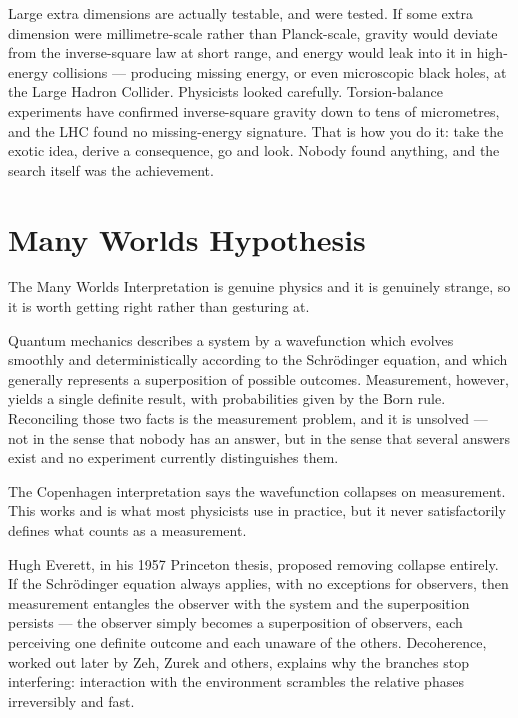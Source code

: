 \begin{funfact}
Large extra dimensions are actually testable, and were tested. If some extra dimension were
millimetre-scale rather than Planck-scale, gravity would deviate from the inverse-square law at
short range, and energy would leak into it in high-energy collisions --- producing missing
energy, or even microscopic black holes, at the Large Hadron Collider. Physicists looked
carefully. Torsion-balance experiments have confirmed inverse-square gravity down to tens of
micrometres, and the LHC found no missing-energy signature. That is how you do it: take the
exotic idea, derive a consequence, go and look. Nobody found anything, and the search itself was
the achievement.
\end{funfact}

\section{Many Worlds Hypothesis}\label{sec:manyworldshypothesis}

The Many Worlds Interpretation is genuine physics and it is genuinely strange, so it is worth
getting right rather than gesturing at.

Quantum mechanics describes a system by a wavefunction which evolves smoothly and
deterministically according to the Schr\"odinger equation, and which generally represents a
superposition of possible outcomes. Measurement, however, yields a single definite result, with
probabilities given by the Born rule. Reconciling those two facts is the measurement problem,
and it is unsolved --- not in the sense that nobody has an answer, but in the sense that several
answers exist and no experiment currently distinguishes them.

The Copenhagen interpretation says the wavefunction collapses on measurement. This works and is
what most physicists use in practice, but it never satisfactorily defines what counts as a
measurement.

Hugh Everett, in his 1957 Princeton thesis, proposed removing collapse entirely. If the
Schr\"odinger equation always applies, with no exceptions for observers, then measurement
entangles the observer with the system and the superposition persists --- the observer simply
becomes a superposition of observers, each perceiving one definite outcome and each unaware of
the others. Decoherence, worked out later by Zeh, Zurek and others, explains why the branches
stop interfering: interaction with the environment scrambles the relative phases irreversibly and
fast.

